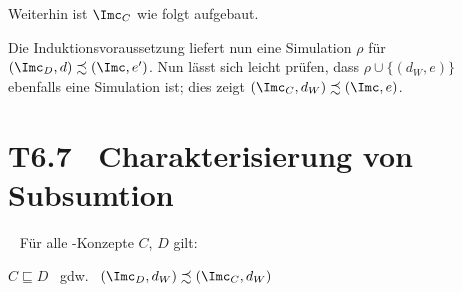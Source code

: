 \documentclass[fontsize=11pt, twoside=false, numbers=autoenddot]{scrbook}
\begin{document}
\begin{description}
\begin{description}
\begin{description}
            Weiterhin ist $\Imc_C$ wie folgt aufgebaut.
            \begin{center}
            \end{center}
            \parI
            Die Induktionsvoraussetzung liefert nun eine Simulation
            $\rho$ für $(\Imc_D,d) \precsim (\Imc,e')$.
            Nun lässt sich leicht prüfen, dass $\rho \cup \{(d_W,e)\}$
            ebenfalls eine Simulation ist;
            dies zeigt $(\Imc_C,d_W) \precsim (\Imc,e)$.
            \qedhere
        \end{description}
    \end{description}
\end{description}

\pagebreak
\section*{T6.7~ Charakterisierung von Subsumtion}

~
Für alle \EL-Konzepte $C$, $D$ gilt:
\begin{center}
  $C \sqsubseteq D$ ~gdw.~ $(\Imc_D,d_W) \precsim (\Imc_C,d_W)$
\end{center}
\end{document}
